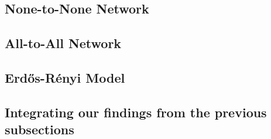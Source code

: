 
\subsection{None-to-None Network}

\subsection{All-to-All Network}

\subsection{Erd\H{o}s-R\'{e}nyi Model}

\subsection{Integrating our findings from the previous subsections}

